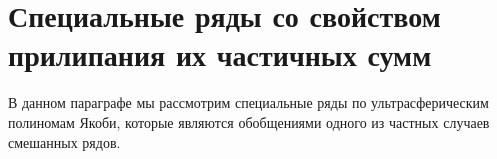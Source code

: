 \chapter{Специальные ряды со свойством прилипания их частичных сумм}\label{sobleg5}




В данном параграфе мы рассмотрим специальные ряды по ультрасферическим полиномам Якоби, которые являются обобщениями одного из частных случаев смешанных рядов.

